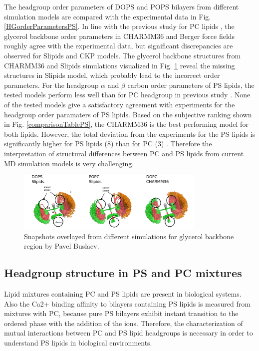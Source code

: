 \documentclass[aps,prl,superscriptaddress,twocolumn]{revtex4}
\begin{document}
The headgroup order parameters of DOPS and POPS bilayers 
from different simulation models are compared with the experimental
data in Fig. \ref{HGorderParametersPS}. In line with the previous
study for PC lipids \cite{botan15}, the glycerol backbone order 
parameters in CHARMM36 and Berger force fields roughly agree with
the experimental data, but significant discrepancies are observed for
Slipids and CKP models. The glycerol backbone structures from CHARMM36 and
Slipids simulations visualized in Fig. \ref{glycerol_buslaev} reveal the
missing structures in Slipids model, which probably lead to the incorrect
order parameters. For the headgroup $\alpha$ and $\beta$ carbon order parameters of PS lipids,
the tested models perform less well than for PC headgroup in previous
study \cite{botan15}. None of the tested models give a satisfactory 
agreement with experiments for the headgroup order paramaters of 
PS lipids. Based on the subjective ranking shown in Fig. \ref{comparisonTablePS},
the CHARMM36 is the best performing model for both lipids.
However, the total deviation from the experiments for the PS lipids is significantly
higher for PS lipids (8) than for PC (3) \cite{botan15}. Therefore the 
interpretation of structural differences between PC and PS lipids 
from current MD simulation models is very challenging.
  


\begin{figure}[]
  \centering
  \includegraphics[width=9.0cm]{../Figs/glycerol_buslaev.png}
  \caption{\label{glycerol_buslaev}
    Snapshots overlayed from different simulations for glycerol backbone region
    by Pavel Buslaev.
  }
\end{figure}


\subsection{Headgroup structure in PS and PC mixtures}
Lipid mixtures containing PC and PS lipids are present in biological
systems. Also the Ca2+ binding affinity to bilayers containing
PS lipids is measured from mixtures with PC, because pure PS
bilayers exhibit instant transition to the ordered phase with the
addition of the ions. Therefore, the characterization of mutual interactions
between PC and PS lipid headgroups is necessary in order to
understand PS lipids in biological environments.
\end{document}

